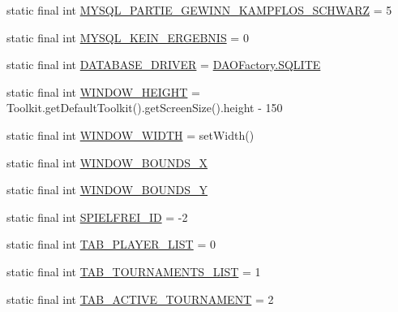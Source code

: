 \begin{DoxyCompactItemize}
\item 
static final int \hyperlink{classde_1_1turnierverwaltung_1_1model_1_1_tournament_constants_ad189690d47e4053b117583f54fbfa77a}{M\+Y\+S\+Q\+L\+\_\+\+P\+A\+R\+T\+I\+E\+\_\+\+G\+E\+W\+I\+N\+N\+\_\+\+K\+A\+M\+P\+F\+L\+O\+S\+\_\+\+S\+C\+H\+W\+A\+RZ} = 5
\item 
static final int \hyperlink{classde_1_1turnierverwaltung_1_1model_1_1_tournament_constants_a9a1f592439428d8eaea7a7ea635c2bda}{M\+Y\+S\+Q\+L\+\_\+\+K\+E\+I\+N\+\_\+\+E\+R\+G\+E\+B\+N\+IS} = 0
\item 
static final int \hyperlink{classde_1_1turnierverwaltung_1_1model_1_1_tournament_constants_a38a9f7a1108374d8cd49346732494b83}{D\+A\+T\+A\+B\+A\+S\+E\+\_\+\+D\+R\+I\+V\+ER} = \hyperlink{classde_1_1turnierverwaltung_1_1mysql_1_1_d_a_o_factory_aa8c60bceb0b843f803bb35fd73400eec}{D\+A\+O\+Factory.\+S\+Q\+L\+I\+TE}
\item 
static final int \hyperlink{classde_1_1turnierverwaltung_1_1model_1_1_tournament_constants_a85d2c1cc994b3a6f44007541e7a3f9be}{W\+I\+N\+D\+O\+W\+\_\+\+H\+E\+I\+G\+HT} = Toolkit.\+get\+Default\+Toolkit().get\+Screen\+Size().height -\/ 150
\item 
static final int \hyperlink{classde_1_1turnierverwaltung_1_1model_1_1_tournament_constants_a22eaed25de0312b3c20dffba71e282ff}{W\+I\+N\+D\+O\+W\+\_\+\+W\+I\+D\+TH} = set\+Width()
\item 
static final int \hyperlink{classde_1_1turnierverwaltung_1_1model_1_1_tournament_constants_a9f680a539f0272876fab23253c57bcb9}{W\+I\+N\+D\+O\+W\+\_\+\+B\+O\+U\+N\+D\+S\+\_\+X}
\item 
static final int \hyperlink{classde_1_1turnierverwaltung_1_1model_1_1_tournament_constants_a9b125c015d3671146dd283fdfa94102d}{W\+I\+N\+D\+O\+W\+\_\+\+B\+O\+U\+N\+D\+S\+\_\+Y}
\item 
static final int \hyperlink{classde_1_1turnierverwaltung_1_1model_1_1_tournament_constants_a4dbc5af90e9433ef2ccbf3bfbf4cadaf}{S\+P\+I\+E\+L\+F\+R\+E\+I\+\_\+\+ID} = -\/2
\item 
static final int \hyperlink{classde_1_1turnierverwaltung_1_1model_1_1_tournament_constants_aa2823f2128e621fc15b624835f481fc7}{T\+A\+B\+\_\+\+P\+L\+A\+Y\+E\+R\+\_\+\+L\+I\+ST} = 0
\item 
static final int \hyperlink{classde_1_1turnierverwaltung_1_1model_1_1_tournament_constants_acfb5b2688f48dc8be99c3fefd6853ad3}{T\+A\+B\+\_\+\+T\+O\+U\+R\+N\+A\+M\+E\+N\+T\+S\+\_\+\+L\+I\+ST} = 1
\item 
static final int \hyperlink{classde_1_1turnierverwaltung_1_1model_1_1_tournament_constants_a5dd4fc62ae5a7bb166b2ec177b735408}{T\+A\+B\+\_\+\+A\+C\+T\+I\+V\+E\+\_\+\+T\+O\+U\+R\+N\+A\+M\+E\+NT} = 2

\end{DoxyCompactItemize}
